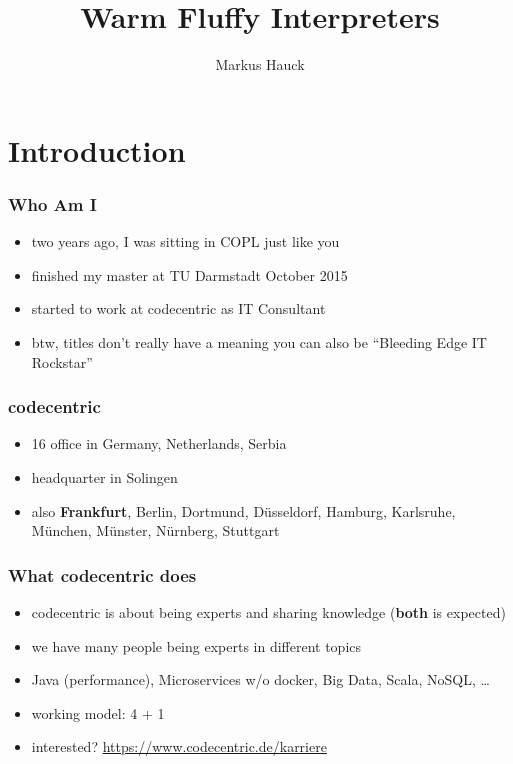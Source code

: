 \documentclass{beamer}
\author{Markus Hauck}
\institute{codecentric AG}
\title{Warm Fluffy Interpreters}
\begin{document}
{
  \begin{frame}
    \titlepage{}
  \end{frame}
}

\begin{frame}
  \tableofcontents
\end{frame}

\section{Introduction}

\begin{frame}
  \frametitle{Who Am I}
  \begin{itemize}
  \item two years ago, I was sitting in COPL just like you
  \item finished my master at TU Darmstadt October 2015
  \item started to work at codecentric as IT Consultant
  \item btw, titles don't really have a meaning you can also be
    ``Bleeding Edge IT Rockstar''
  \end{itemize}
\end{frame}

\begin{frame}
  \frametitle{codecentric}
  \begin{itemize}
  \item 16 office in Germany, Netherlands, Serbia
  \item headquarter in Solingen
  \item also \textbf{Frankfurt}, Berlin, Dortmund, Düsseldorf,
    Hamburg, Karlsruhe, München, Münster, Nürnberg, Stuttgart
  \end{itemize}
\end{frame}

\begin{frame}
  \frametitle{What codecentric does}
  \begin{itemize}
  \item codecentric is about being experts and sharing knowledge (\textbf{both}
    is expected)
  \item we have many people being experts in different topics
  \item Java (performance), Microservices w/o docker, Big Data, Scala, NoSQL,
    \ldots
  \item working model: 4 + 1
  \item interested? \url{https://www.codecentric.de/karriere}
  \end{itemize}
\end{frame}
\end{document}

